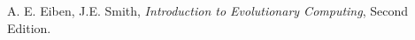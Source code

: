 \begin{thebibliography}{9}

  A. E. Eiben, J.E. Smith,
  \emph{Introduction to Evolutionary Computing},
  Second Edition.

\end{thebibliography}